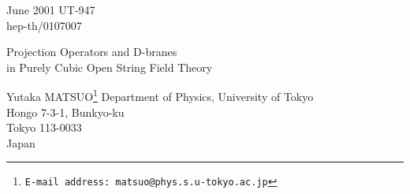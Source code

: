 \documentclass[a4paper,12pt]{article}
\begin{document}
\begin{titlepage}
\nopagebreak
%
%
\begin{flushright}
June 2001\hfill
UT-947\\
hep-th/0107007
\end{flushright}

\renewcommand{\thefootnote}{\fnsymbol{footnote}}
\vfill
\begin{center}
{\Large Projection Operators and D-branes}\\
{\Large in Purely Cubic Open String Field Theory}

\vskip 20mm

Yutaka MATSUO\footnote{
{\tt E-mail address: matsuo@phys.s.u-tokyo.ac.jp}
}
\vskip 1cm
Department of Physics, University of Tokyo\\
Hongo 7-3-1, Bunkyo-ku\\
Tokyo 113-0033\\
Japan
\end{center}
\vfill

\begin{abstract}
We study a matrix version of the purely cubic open string
field theory as describing the expansion
around the closed string vacuum.
Any D-branes in the given closed string background can appear
as classical solutions by using the identity projectors.
Expansion around this solution
gives the correct kinetic term
for the open strings on the created D-branes
while there are some subtleties in the unwanted degree of 
freedom.
\end{abstract}
\vfill
\end{titlepage}

\end{document}
